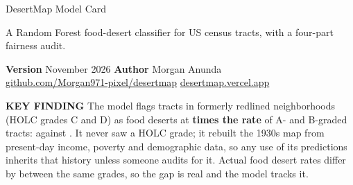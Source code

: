 \documentclass[10pt,letterpaper]{article}
\begin{document}
\begin{tcolorbox}[enhanced, sharp corners, boxrule=0pt, toprule=3pt,
  colframe=accent, colback=accentwash, left=10pt, right=10pt, top=6pt, bottom=6pt]
{\headfont\fontsize{21}{24}\selectfont DesertMap Model Card}\par\vspace{2pt}
{\fontsize{11.5}{14}\selectfont A Random Forest food-desert classifier for \NTracts{} US census tracts, with a four-part fairness audit.}\par\vspace{4pt}
{\small\raggedright\color{muted}\textbf{Version} November 2026 \quad\textbullet\quad \textbf{Author} Morgan Anunda\\ \href{https://github.com/Morgan971-pixel/desertmap}{github.com/Morgan971-pixel/desertmap} \quad\textbullet\quad \href{https://desertmap.vercel.app}{desertmap.vercel.app}\par}
\end{tcolorbox}

\vspace{1pt}
\begin{tcolorbox}[enhanced, sharp corners, boxrule=0.8pt, colframe=accent, colback=white,
  sidebyside, sidebyside align=center, lefthand width=1.25in, segmentation hidden,
  left=8pt, right=10pt, top=5pt, bottom=5pt]
\centering{\headfont\fontsize{34}{36}\selectfont\color{accentdark}\HolcRatio\texttimes{}}\par
{\footnotesize\color{muted}\textbf{KEY FINDING}}
\tcblower
The model flags tracts in formerly redlined neighborhoods (HOLC grades C and D) as food deserts at \textbf{\HolcRatio{} times the rate} of A- and B-graded tracts: \CdRate{} against \AbRate. It never saw a HOLC grade; it rebuilt the 1930s map from present-day income, poverty and demographic data, so any use of its predictions inherits that history unless someone audits for it. Actual food desert rates differ by \HolcLabelRatio\texttimes{} between the same grades, so the gap is real and the model tracks it.
\end{tcolorbox}
\end{document}
